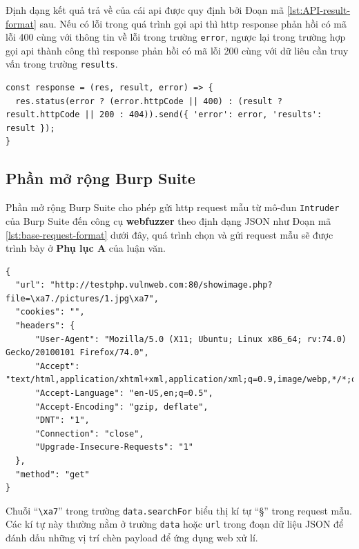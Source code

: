 Định dạng kết quả trả về của cái \acrshort{api} được quy định bởi Đoạn mã \ref{lst:API-result-format} sau. Nếu có lỗi trong quá trình gọi \acrshort{api} thì \acrshort{http} response phản hồi có mã lỗi 400 cùng với thông tin về lỗi trong trường \texttt{error}, ngược lại trong trường hợp gọi \acrshort{api} thành công thì response phản hồi có mã lỗi 200 cùng với dữ liêu cần truy vấn trong trường \texttt{results}.
\begin{lstlisting}[style=ES6, label={lst:API-result-format}, caption={Định dạng kết quả API trả về ở backend}]
const response = (res, result, error) => {
  res.status(error ? (error.httpCode || 400) : (result ? result.httpCode || 200 : 404)).send({ 'error': error, 'results': result });
}
\end{lstlisting}
\subsection{Phần mở rộng Burp Suite}
Phần mở rộng Burp Suite cho phép gửi \acrshort{http} request mẫu từ mô-đun \texttt{Intruder} của Burp Suite đến công cụ \textbf{webfuzzer} theo định dạng JSON như Đoạn mã \ref{lst:base-request-format} dưới đây, quá trình chọn và gửi request mẫu sẽ được trình bày ở \textbf{Phụ lục A} của luận văn.
\begin{lstlisting}[style=ES6, label={lst:base-request-format}, caption={Cấu trúc của một HTTP request mẫu được gửi từ phần mở rộng Burp Suite}]
{
  "url": "http://testphp.vulnweb.com:80/showimage.php?file=\xa7./pictures/1.jpg\xa7",
  "cookies": "",
  "headers": {
      "User-Agent": "Mozilla/5.0 (X11; Ubuntu; Linux x86_64; rv:74.0) Gecko/20100101 Firefox/74.0",
      "Accept": "text/html,application/xhtml+xml,application/xml;q=0.9,image/webp,*/*;q=0.8",
      "Accept-Language": "en-US,en;q=0.5",
      "Accept-Encoding": "gzip, deflate",
      "DNT": "1",
      "Connection": "close",
      "Upgrade-Insecure-Requests": "1"
  },
  "method": "get"
}
\end{lstlisting}
Chuỗi ``\texttt{\textbackslash xa7}'' trong trường \texttt{data.searchFor} biểu thị kí tự ``\S'' trong request mẫu. Các kí tự này thường nằm ở trường \texttt{data} hoặc \texttt{url} trong đoạn dữ liệu JSON để đánh dấu những vị trí chèn payload để ứng dụng web xử lí. 
